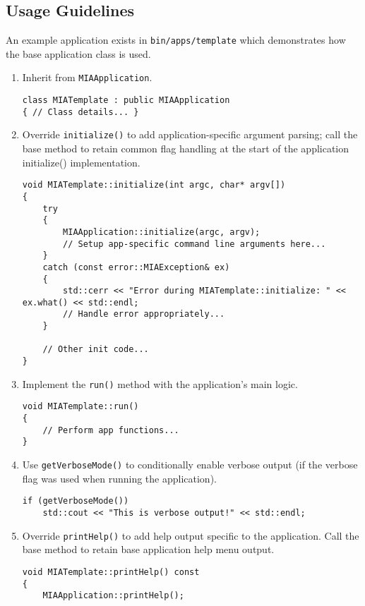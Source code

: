 \subsection*{Usage Guidelines}
An example application exists in \texttt{bin/apps/template} which demonstrates how the base application class is used.
\begin{enumerate}
	\item Inherit from \texttt{MIAApplication}.
	\begin{lstlisting}[style=cppstyle]
class MIATemplate : public MIAApplication
{ // Class details... }
	\end{lstlisting}
	\item Override \texttt{initialize()} to add application-specific argument parsing; call the base method to retain common flag handling at the start of the application initialize() implementation.
	\begin{lstlisting}[style=cppstyle]
void MIATemplate::initialize(int argc, char* argv[])
{
	try
	{    
		MIAApplication::initialize(argc, argv);	
		// Setup app-specific command line arguments here...
	}
	catch (const error::MIAException& ex)
	{
		std::cerr << "Error during MIATemplate::initialize: " << ex.what() << std::endl;
		// Handle error appropriately...
	}
	
	// Other init code...
}
	\end{lstlisting}
	\item Implement the \texttt{run()} method with the application's main logic.
	\begin{lstlisting}[style=cppstyle]
void MIATemplate::run()
{
	// Perform app functions...
}
	\end{lstlisting}
	\item Use \texttt{getVerboseMode()} to conditionally enable verbose output (if the verbose flag was used when running the application).
	\begin{lstlisting}[style=cppstyle]
if (getVerboseMode())
    std::cout << "This is verbose output!" << std::endl;
	\end{lstlisting}
	\item Override \texttt{printHelp()} to add help output specific to the application. Call the base method to retain base application help menu output.
	\begin{lstlisting}[style=cppstyle]
void MIATemplate::printHelp() const
{
    MIAApplication::printHelp();
    

\end{lstlisting}
\end{enumerate}
